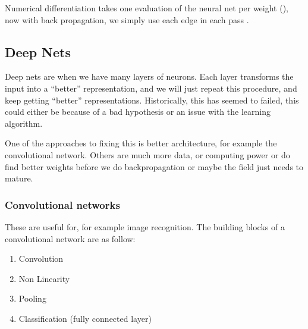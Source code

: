     Numerical differentiation takes one evaluation of the neural net per weight 
    (), now with back propagation, we simply use each edge 
    in each pass .
    
    \subsection{Deep Nets}
    Deep nets are when we have many layers of neurons. Each layer transforms 
    the input into a ``better'' representation, and we will just repeat this 
    procedure, and keep getting ``better'' representations. Historically, this 
    has seemed to failed, this could either be because of a bad hypothesis or 
    an issue with the learning algorithm.
    
    One of the approaches to fixing this is better architecture, for example 
    the convolutional network. Others are much more data, or computing power or 
    do find better weights before we do backpropagation or maybe the field just 
    needs to mature.
    
    \subsubsection{Convolutional networks}
    These are useful for, for example image recognition. The building blocks of 
    a convolutional network are as follow:
    \begin{enumerate}
        \item Convolution
        \item Non Linearity
        \item Pooling
        \item Classification (fully connected layer)
    \end{enumerate}
    
